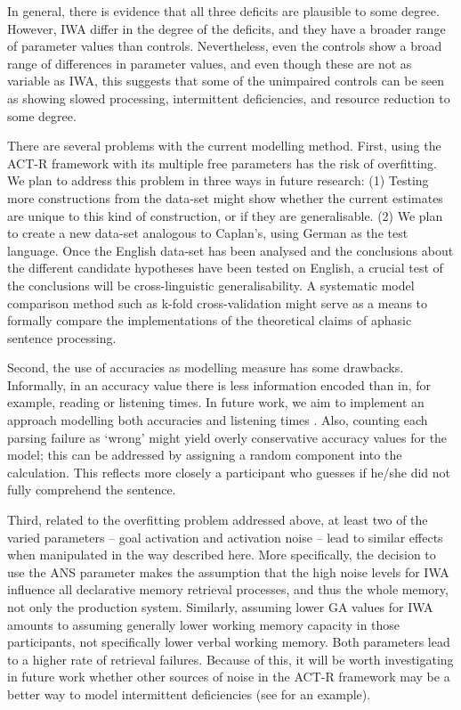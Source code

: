 \documentclass{cambridge7A}\usepackage[]{graphicx}\usepackage[]{color}
\begin{document}
In general, there is evidence that all three deficits are plausible to some degree. However, IWA differ in the degree of the deficits, and they have a broader range of parameter values than controls.
Nevertheless, even the controls show a broad range of differences in parameter values, and even though these are not as variable as IWA, this suggests that some of the unimpaired controls can be seen as showing slowed processing, intermittent deficiencies, and resource reduction to some degree.

There are several problems with the current modelling method. First, using the ACT-R framework with its multiple free parameters has the risk of overfitting. We plan to address this problem in three ways in future research: (1) Testing more constructions from the \cite{CaplanEtAl2015} data-set might show whether the current estimates are unique to this kind of construction, or if they are generalisable. (2) We plan to create a new data-set analogous to Caplan's, using German as the test language. Once the English data-set has been analysed and the conclusions about the different candidate hypotheses have been tested on English, a crucial test of the conclusions will be cross-linguistic generalisability.
A systematic model comparison method such as k-fold cross-validation might 
serve  as a means to formally compare the implementations of the theoretical claims of aphasic sentence processing.

Second, the use of accuracies as modelling measure has some drawbacks. Informally, in an accuracy value there is less information encoded than in, for example, reading or listening times. In future work, we aim to implement an approach modelling both accuracies and listening times \citep{NicenboimRetrieval2018}. Also, counting each parsing failure as `wrong' might yield overly conservative accuracy values for the model; this can be addressed by assigning a random component into the calculation. This reflects more closely a participant who guesses if he/she did not fully comprehend the sentence.

Third, related to the overfitting problem addressed above, at least two of the varied parameters -- goal activation and activation noise -- lead to similar effects when manipulated in the way described here. 
More specifically, the decision to use the ANS parameter makes the assumption that the high noise levels for IWA influence all declarative memory retrieval processes, and thus the whole memory, not only the production system. 
Similarly, assuming lower GA values for IWA amounts to assuming generally lower working memory capacity in those participants, not specifically lower verbal working memory.
Both parameters lead to a higher rate of retrieval failures. Because of this, it will be worth investigating in future work whether other sources of noise in the ACT-R framework may be a better way to model intermittent deficiencies (see \cite{PatilEtAl2016} for an example).
\end{document}

